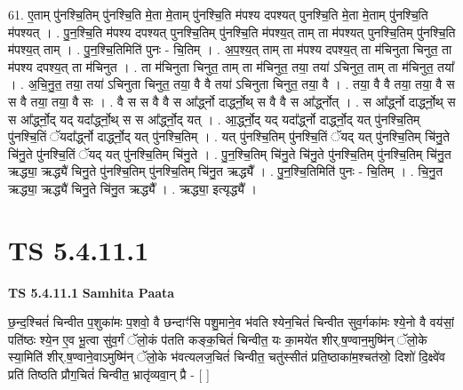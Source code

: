 \documentclass[17pt]{extarticle}
\begin{document}
61. ए॒ताम् पु॑नश्चि॒तिम् पु॑नश्चि॒ति मे॒ता मे॒ताम् पु॑नश्चि॒ति म॑पश्य दपश्यत् पुनश्चि॒ति मे॒ता मे॒ताम् पु॑नश्चि॒ति म॑पश्यत् । . पु॒न॒श्चि॒ति म॑पश्य दपश्यत् पुनश्चि॒तिम् पु॑नश्चि॒ति म॑पश्य॒त् ताम् ता म॑पश्यत् पुनश्चि॒तिम् पु॑नश्चि॒ति म॑पश्य॒त् ताम् । . पु॒न॒श्चि॒तिमिति॑ पुनः - चि॒तिम् । . अ॒प॒श्य॒त् ताम् ता म॑पश्य दपश्य॒त् ता म॑चिनुता चिनुत॒ ता म॑पश्य दपश्य॒त् ता म॑चिनुत । . ता म॑चिनुता चिनुत॒ ताम् ता म॑चिनुत॒ तया॒ तया॑ ऽचिनुत॒ ताम् ता म॑चिनुत॒ तया᳚ । . अ॒चि॒नु॒त॒ तया॒ तया॑ ऽचिनुता चिनुत॒ तया॒ वै वै तया॑ ऽचिनुता चिनुत॒ तया॒ वै । . तया॒ वै वै तया॒ तया॒ वै स स वै तया॒ तया॒ वै सः । . वै स स वै वै स आ᳚र्द्ध्नो दार्द्ध्नो॒थ् स वै वै स आ᳚र्द्ध्नोत् । . स आ᳚र्द्ध्नो दार्द्ध्नो॒थ् स स आ᳚र्द्ध्नो॒द् यद् यदा᳚र्द्ध्नो॒थ् स स आ᳚र्द्ध्नो॒द् यत् । . आ॒र्द्ध्नो॒द् यद् यदा᳚र्द्ध्नो दार्द्ध्नो॒द् यत् पु॑नश्चि॒तिम् पु॑नश्चि॒तिं ॅयदा᳚र्द्ध्नो दार्द्ध्नो॒द् यत् पु॑नश्चि॒तिम् । . यत् पु॑नश्चि॒तिम् पु॑नश्चि॒तिं ॅयद् यत् पु॑नश्चि॒तिम् चि॑नु॒ते चि॑नु॒ते पु॑नश्चि॒तिं ॅयद् यत् पु॑नश्चि॒तिम् चि॑नु॒ते । . पु॒न॒श्चि॒तिम् चि॑नु॒ते चि॑नु॒ते पु॑नश्चि॒तिम् पु॑नश्चि॒तिम् चि॑नु॒त ऋद्ध्या॒ ऋद्ध्यै॑ चिनु॒ते पु॑नश्चि॒तिम् पु॑नश्चि॒तिम् चि॑नु॒त ऋद्ध्यै᳚ । . पु॒न॒श्चि॒तिमिति॑ पुनः - चि॒तिम् । . चि॒नु॒त ऋद्ध्या॒ ऋद्ध्यै॑ चिनु॒ते चि॑नु॒त ऋद्ध्यै᳚ । . ऋद्ध्या॒ इत्यृद्ध्यै᳚ । \newline
\pagebreak
{}

\section{ TS 5.4.11.1 }

\textbf{TS 5.4.11.1 } \newline
\textbf{Samhita Paata} \newline

छ॒न्द॒श्चितं॑ चिन्वीत प॒शुका॑मः प॒शवो॒ वै छन्दाꣳ॑सि पशु॒माने॒व भ॑वति श्येन॒चितं॑ चिन्वीत सुव॒र्गका॑मः श्ये॒नो वै वय॑सां॒ पति॑ष्ठः श्ये॒न ए॒व भू॒त्वा सु॑व॒र्गं ॅलो॒कं प॑तति कङ्क॒चितं॑ चिन्वीत॒ यः का॒मये॑त शीर्.ष॒ण्वान॒मुष्मि॑न् ॅलो॒के स्या॒मिति॑ शीर्.ष॒ण्वाने॒वाऽमुष्मि॑न् ॅलो॒के भ॑वत्यलज॒चितं॑ चिन्वीत॒ चतु॑स्सीतं प्रति॒ष्ठाका॑म॒श्चत॑स्रो॒ दिशो॑ दि॒क्ष्वे॑व प्रति॑ तिष्ठति प्रौग॒चितं॑ चिन्वीत॒ भ्रातृ॑व्यवा॒न् प्रै - [  ] \newline
\end{document}
